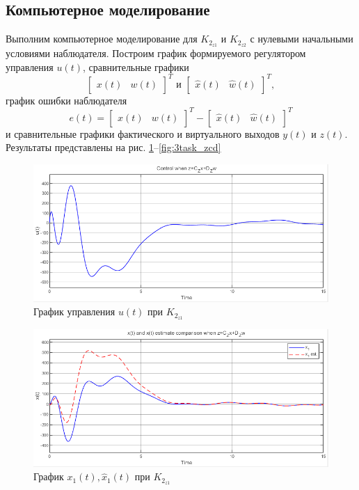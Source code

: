 \documentclass[a4paper, 12pt]{article}
\begin{document}
    \subsection{Компьютерное моделирование}
    Выполним компьютерное моделирование для $K_{2_{z1}}$ и $K_{2_{z2}}$
    с нулевыми начальными условиями наблюдателя. Построим график
    формируемого регулятором управления $u(t)$, сравнительные графики
    $$\begin{bmatrix}
        x(t) &w(t)
    \end{bmatrix}^T\text{ и }\begin{bmatrix}
        \hat{x}(t) &\hat{w}(t)
    \end{bmatrix}^T,$$ график ошибки наблюдателя $$e(t)=\begin{bmatrix}
        x(t) &w(t)
    \end{bmatrix}^T-\begin{bmatrix}
        \hat{x}(t) &\hat{w}(t)
    \end{bmatrix}^T$$ и сравнительные графики фактического и виртуального выходов $y(t)$ и $z(t)$.
    Результаты представлены на рис. \ref{fig:3task_uczdz}--\ref{fig:3task_zcd}
    \begin{figure}[H]
        \centering
        \includegraphics[scale=0.75]{3task_uczdz.png}
        \captionsetup{skip=0pt}
        \caption{График управления $u(t)$ при $K_{2_{z1}}$}
        \label{fig:3task_uczdz}
    \end{figure}
    \begin{figure}[H]
        \centering
        \includegraphics[scale=0.75]{3task_xxh1czdz.png}
        \captionsetup{skip=0pt}
        \caption{График $x_1(t),\hat{x}_1(t)$ при $K_{2_{z1}}$}
        \label{fig:3task_xxh1czdz}
    \end{figure}
\end{document}
